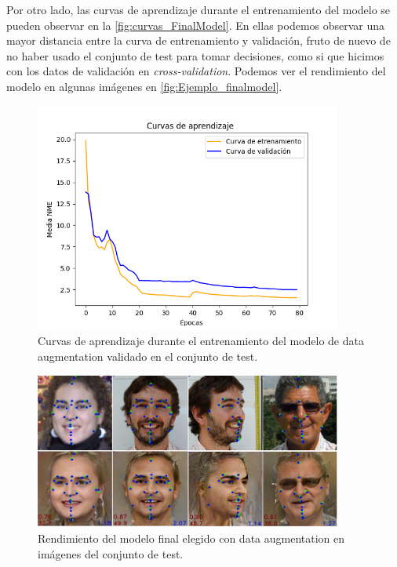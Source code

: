        \medskip

        \noindent Por otro lado, las curvas de aprendizaje durante el entrenamiento del modelo se pueden observar en la \autoref{fig:curvas_FinalModel}. En ellas podemos observar una mayor distancia entre la curva de entrenamiento y validación, fruto de nuevo de no haber usado el conjunto de test para tomar decisiones, como si que hicimos con los datos de validación en \textit{cross-validation}. Podemos ver el rendimiento del modelo en algunas imágenes en \autoref{fig:Ejemplo_finalmodel}.

        \begin{figure}[H]
            \centering
            \includegraphics[width=0.9\textwidth]{img/curvas_FinalModel.png}
            \caption{Curvas de aprendizaje durante el entrenamiento del modelo de data augmentation validado en el conjunto de test.}
            \label{fig:curvas_FinalModel}
        \end{figure}

        \begin{figure}[H]
            \centering
            \includegraphics[width=0.9\textwidth]{img/image_finalmodel.png}
            \caption{Rendimiento del modelo final elegido con data augmentation en imágenes del conjunto de test.}
            \label{fig:Ejemplo_finalmodel}
        \end{figure}

